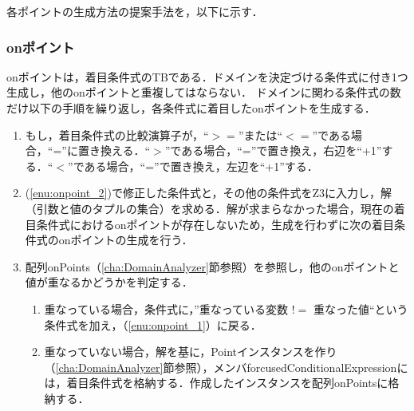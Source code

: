 \documentclass[uplatex, report, a4j, 10pt]{jsbook}
\begin{document}
各ポイントの生成方法の提案手法を，以下に示す．

\subsubsection{onポイント}
onポイントは，着目条件式のTBである．ドメインを決定づける条件式に付き1つ生成し，他のonポイントと重複してはならない．
ドメインに関わる条件式の数だけ以下の手順を繰り返し，各条件式に着目したonポイントを生成する．
\begin{enumerate}
  \item\label{enu:onpoint_2} もし，着目条件式の比較演算子が，“$>=$”または“$<=$”である場合，“=”に置き換える．“$>$”である場合，“=”で置き換え，右辺を“+1”する．“$<$”である場合，“=”で置き換え，左辺を“+1”する．
  \item\label{enu:onpoint_1} (\ref{enu:onpoint_2})で修正した条件式と，その他の条件式をZ3に入力し，解（引数と値のタプルの集合）を求める．解が求まらなかった場合，現在の着目条件式におけるonポイントが存在しないため，生成を行わずに次の着目条件式のonポイントの生成を行う．
  \item 配列onPoints（\ref{cha:DomainAnalyzer}節参照）を参照し，他のonポイントと値が重なるかどうかを判定する．
        \begin{enumerate}
          \item 重なっている場合，条件式に，”重なっている変数 $!=$ 重なった値“という条件式を加え，（\ref{enu:onpoint_1}）に戻る．
          \item 重なっていない場合，解を基に，Pointインスタンスを作り（\ref{cha:DomainAnalyzer}節参照），メンバforcusedConditionalExpressionには，着目条件式を格納する．作成したインスタンスを配列onPointsに格納する．
        \end{enumerate}
\end{enumerate}
\end{document}
